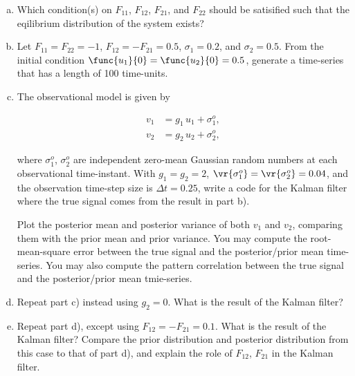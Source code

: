 \begin{enumerate}[a)]
	\item Which condition(s) on $F_{11}$, $F_{12}$, $F_{21}$, and $F_{22}$ should be satisified such that the eqilibrium distribution of the system exists?
	
	\item Let $F_{11} = F_{22} = -1$, $F_{12} = -F_{21} = 0.5$, $\sigma_1 = 0.2$, and $\sigma_2 = 0.5$. From the initial condition $\func{u_1}{0} = \func{u_2}{0} = 0.5$, generate a time-series that has a length of 100 time-units.
	
	\item The observational model is given by
	
	\begin{subequations}
		\begin{align}
			v_1 &= g_1\,u_1 + \sigma_1^{o}, \\
			v_2 &= g_2\,u_2 + \sigma_2^{o},
		\end{align}
	\end{subequations}
	
	where $\sigma_1^{o}$, $\sigma_2^{o}$ are independent zero-mean Gaussian random numbers at each observational time-instant. With $g_1 = g_2 = 2$, $\vr{\sigma_1^{o}} = \vr{\sigma_2^{o}} = 0.04$, and the observation time-step size is $\Delta t = 0.25$, write a code for the Kalman filter where the true signal comes from the result in part b).
	
	Plot the posterior mean and posterior variance of both $v_1$ and $v_2$, comparing them with the prior mean and prior variance. You may compute the root-mean-square error between the true signal and the posterior/prior mean time-series. You may also compute the pattern correlation between the true signal and the posterior/prior mean tmie-series.
	
	\item Repeat part c) instead using $g_2 = 0$. What is the result of the Kalman filter?
	
	\item Repeat part d), except using $F_{12} = -F_{21} = 0.1$. What is the result of the Kalman filter? Compare the prior distribution and posterior distribution from this case to that of part d), and explain the role of $F_{12}$, $F_{21}$ in the Kalman filter.
\end{enumerate}

